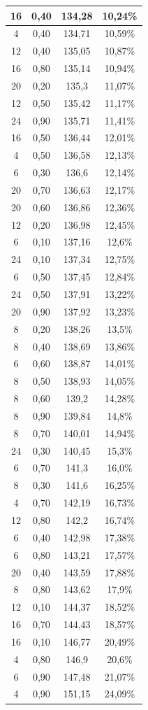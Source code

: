 \begin{center}
\begin{longtable}{|c|c|c|c|}
16 & 0,40 & 134,28 & 10,24\% \\ \hline
4 & 0,40 & 134,71 & 10,59\% \\ \hline
12 & 0,40 & 135,05 & 10,87\% \\ \hline
16 & 0,80 & 135,14 & 10,94\% \\ \hline
20 & 0,20 & 135,3 & 11,07\% \\ \hline
12 & 0,50 & 135,42 & 11,17\% \\ \hline
24 & 0,90 & 135,71 & 11,41\% \\ \hline
16 & 0,50 & 136,44 & 12,01\% \\ \hline
4 & 0,50 & 136,58 & 12,13\% \\ \hline
6 & 0,30 & 136,6 & 12,14\% \\ \hline
20 & 0,70 & 136,63 & 12,17\% \\ \hline
20 & 0,60 & 136,86 & 12,36\% \\ \hline
12 & 0,20 & 136,98 & 12,45\% \\ \hline
6 & 0,10 & 137,16 & 12,6\% \\ \hline
24 & 0,10 & 137,34 & 12,75\% \\ \hline
6 & 0,50 & 137,45 & 12,84\% \\ \hline
24 & 0,50 & 137,91 & 13,22\% \\ \hline
20 & 0,90 & 137,92 & 13,23\% \\ \hline
8 & 0,20 & 138,26 & 13,5\% \\ \hline
8 & 0,40 & 138,69 & 13,86\% \\ \hline
6 & 0,60 & 138,87 & 14,01\% \\ \hline
8 & 0,50 & 138,93 & 14,05\% \\ \hline
8 & 0,60 & 139,2 & 14,28\% \\ \hline
8 & 0,90 & 139,84 & 14,8\% \\ \hline
8 & 0,70 & 140,01 & 14,94\% \\ \hline
24 & 0,30 & 140,45 & 15,3\% \\ \hline
6 & 0,70 & 141,3 & 16,0\% \\ \hline
8 & 0,30 & 141,6 & 16,25\% \\ \hline
4 & 0,70 & 142,19 & 16,73\% \\ \hline
12 & 0,80 & 142,2 & 16,74\% \\ \hline
6 & 0,40 & 142,98 & 17,38\% \\ \hline
6 & 0,80 & 143,21 & 17,57\% \\ \hline
20 & 0,40 & 143,59 & 17,88\% \\ \hline
8 & 0,80 & 143,62 & 17,9\% \\ \hline
12 & 0,10 & 144,37 & 18,52\% \\ \hline
16 & 0,70 & 144,43 & 18,57\% \\ \hline
16 & 0,10 & 146,77 & 20,49\% \\ \hline
4 & 0,80 & 146,9 & 20,6\% \\ \hline
6 & 0,90 & 147,48 & 21,07\% \\ \hline
4 & 0,90 & 151,15 & 24,09\% \\ \hline
\end{longtable}
\label{table:historicalVolatilityAppendixTable}
\end{center}
\normalsize

